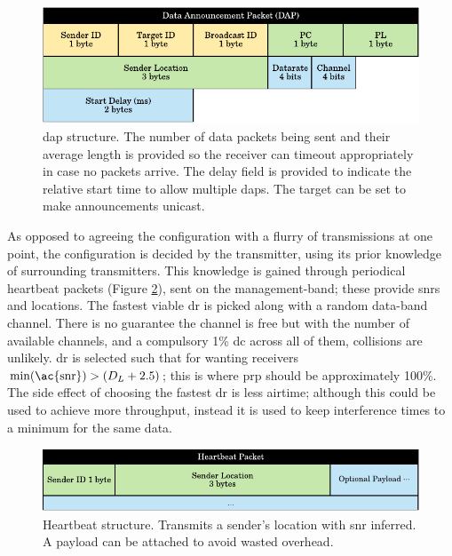 \begin{figure}[H]
    \centering
   	\includegraphics{Figures/dap}
    \caption[Data Announcement Packet (\ac{dap})]{
 		 \ac{dap} structure. The number of data packets being sent and their average length is provided so the receiver can timeout appropriately in case no packets arrive. The delay field is provided to indicate the relative start time to allow multiple \ac{dap}s. The target can be set to make announcements unicast.
    }
    \label{fig:dap_packet}
\end{figure}

As opposed to agreeing the configuration with a flurry of transmissions at one point, the configuration is decided by the transmitter, using its prior knowledge of surrounding transmitters. This knowledge is gained through periodical heartbeat packets (Figure \ref{fig:heartbeat_packet}), sent on the management-band; these provide \ac{snr}s and locations. The fastest viable \ac{dr} is picked along with a random data-band channel. There is no guarantee the channel is free but with the number of available channels, and a compulsory 1\% \ac{dc} across all of them, collisions are unlikely. \ac{dr} is selected such that for wanting receivers $\min(\text{\ac{snr}}) > (D_L + 2.5)$; this is where \ac{prp} should be approximately 100\%. The side effect of choosing the fastest \ac{dr} is less airtime; although this could be used to achieve more throughput, instead it is used to keep interference times to a minimum for the same data.

\begin{figure}[H]
    \centering
   	\includegraphics{Figures/heartbeat_packet}
    \caption[Heartbeat Packet]{
    	Heartbeat structure. Transmits a sender's location with \ac{snr} inferred. A payload can be attached to avoid wasted overhead.	
    }
    \label{fig:heartbeat_packet}
\end{figure}


